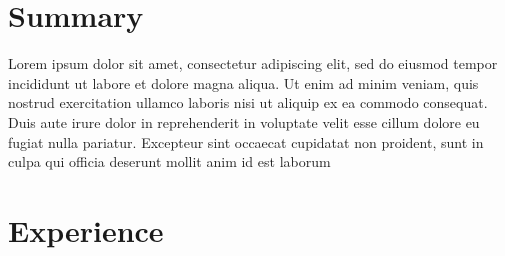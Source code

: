 \documentclass[letterpaper]{DS_class_file} %
\begin{document}
\makeprofile %


\section{Summary}
Lorem ipsum dolor sit amet, consectetur adipiscing elit, sed do eiusmod tempor incididunt ut labore et dolore magna aliqua. Ut enim ad minim veniam, quis nostrud exercitation ullamco laboris nisi ut aliquip ex ea commodo consequat. Duis aute irure dolor in reprehenderit in voluptate velit esse cillum dolore eu fugiat nulla pariatur. Excepteur sint occaecat cupidatat non proident, sunt in culpa qui officia deserunt mollit anim id est laborum


\section{Experience}
\end{document}
